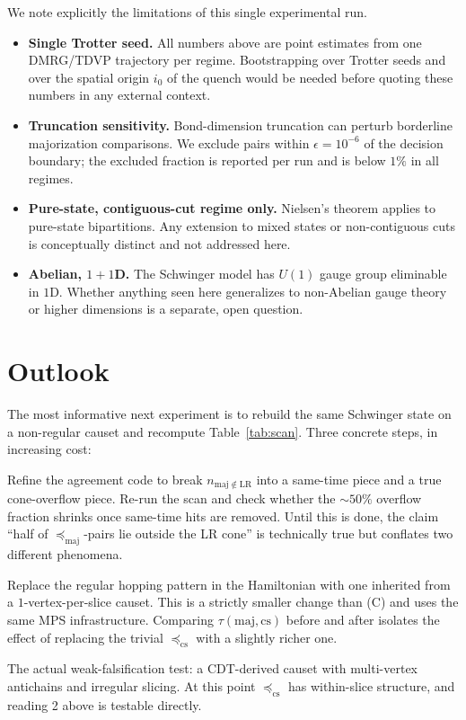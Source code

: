 \documentclass[11pt,a4paper]{article}
\theoremstyle{definition}
\theoremstyle{plain}
\theoremstyle{remark}
\newcommand{\maj}{\mathrm{maj}}
\newcommand{\LR}{\mathrm{LR}}
\newcommand{\cs}{\mathrm{cs}}
\begin{document}
We note explicitly the limitations of this single experimental run.
\begin{itemize}[nosep]
\item \textbf{Single Trotter seed.}  All numbers above are point
      estimates from one DMRG/TDVP trajectory per regime.  Bootstrapping
      over Trotter seeds and over the spatial origin $i_0$ of the
      quench would be needed before quoting these numbers in any
      external context.
\item \textbf{Truncation sensitivity.}  Bond-dimension truncation can
      perturb borderline majorization comparisons.  We exclude pairs
      within $\epsilon = 10^{-6}$ of the decision boundary; the
      excluded fraction is reported per run and is below $1\%$ in all
      regimes.
\item \textbf{Pure-state, contiguous-cut regime only.}  Nielsen's
      theorem applies to pure-state bipartitions.  Any extension to
      mixed states or non-contiguous cuts is conceptually distinct and
      not addressed here.
\item \textbf{Abelian, $1{+}1$D.}  The Schwinger model has $U(1)$
      gauge group eliminable in $1$D.  Whether anything seen here
      generalizes to non-Abelian gauge theory or higher dimensions is
      a separate, open question.
\end{itemize}

\section{Outlook}\label{sec:outlook}

The most informative next experiment is to rebuild the same Schwinger
state on a non-regular causet and recompute Table~\ref{tab:scan}.
Three concrete steps, in increasing cost:

\begin{description}[leftmargin=2em,style=nextline]
\item[(A) Same-time/cross-time split (under one day).]
Refine the agreement code to break $n_{\maj \notin \LR}$ into a
same-time piece and a true cone-overflow piece.  Re-run the scan and
check whether the $\sim 50\%$ overflow fraction shrinks once same-time
hits are removed.  Until this is done, the claim ``half of
$\preceq_{\maj}$-pairs lie outside the LR cone'' is technically true
but conflates two different phenomena.
\item[(B) Chain-causet rebuild (one to three days).]
Replace the regular hopping pattern in the Hamiltonian with one
inherited from a $1$-vertex-per-slice causet.  This is a strictly
smaller change than (C) and uses the same MPS infrastructure.  Comparing
$\tau(\maj, \cs)$ before and after isolates the effect of replacing
the trivial $\preceq_{\cs}$ with a slightly richer one.
\item[(C) Non-trivial CDT spacetime (one to two weeks).]
The actual weak-falsification test: a CDT-derived causet with
multi-vertex antichains and irregular slicing.  At this point
$\preceq_{\cs}$ has within-slice structure, and reading 2 above is
testable directly.
\end{description}
\end{document}
